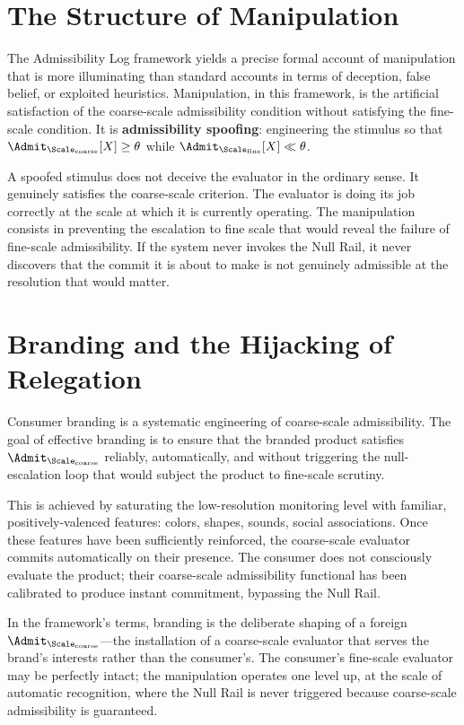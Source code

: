 \documentclass[11pt,oneside]{book}
\begin{document}
\section{The Structure of Manipulation}

The Admissibility Log framework yields a precise formal account of manipulation that is more illuminating than standard accounts in terms of deception, false belief, or exploited heuristics. Manipulation, in this framework, is the artificial satisfaction of the coarse-scale admissibility condition without satisfying the fine-scale condition. It is \textbf{admissibility spoofing}: engineering the stimulus so that $\Admit_{\Scale_{\mathrm{coarse}}}[X] \ge \theta$ while $\Admit_{\Scale_{\mathrm{fine}}}[X] \ll \theta$.

A spoofed stimulus does not deceive the evaluator in the ordinary sense. It genuinely satisfies the coarse-scale criterion. The evaluator is doing its job correctly at the scale at which it is currently operating. The manipulation consists in preventing the escalation to fine scale that would reveal the failure of fine-scale admissibility. If the system never invokes the Null Rail, it never discovers that the commit it is about to make is not genuinely admissible at the resolution that would matter.

\section{Branding and the Hijacking of Relegation}

Consumer branding is a systematic engineering of coarse-scale admissibility. The goal of effective branding is to ensure that the branded product satisfies $\Admit_{\Scale_{\mathrm{coarse}}}$ reliably, automatically, and without triggering the null-escalation loop that would subject the product to fine-scale scrutiny.

This is achieved by saturating the low-resolution monitoring level with familiar, positively-valenced features: colors, shapes, sounds, social associations. Once these features have been sufficiently reinforced, the coarse-scale evaluator commits automatically on their presence. The consumer does not consciously evaluate the product; their coarse-scale admissibility functional has been calibrated to produce instant commitment, bypassing the Null Rail.

In the framework's terms, branding is the deliberate shaping of a foreign $\Admit_{\Scale_{\mathrm{coarse}}}$---the installation of a coarse-scale evaluator that serves the brand's interests rather than the consumer's. The consumer's fine-scale evaluator may be perfectly intact; the manipulation operates one level up, at the scale of automatic recognition, where the Null Rail is never triggered because coarse-scale admissibility is guaranteed.
\end{document}
